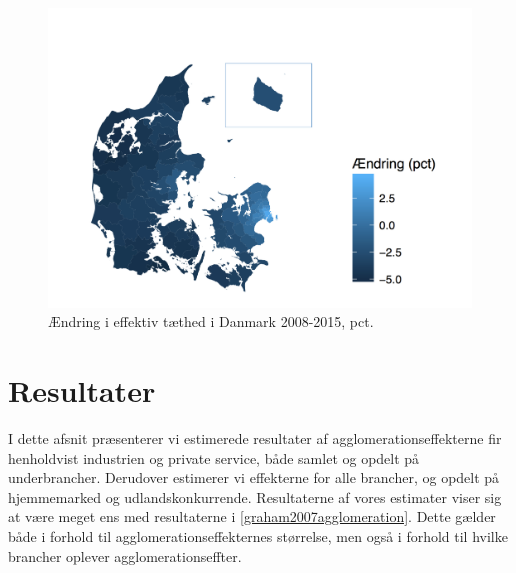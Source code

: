 \documentclass[a4paper, 12pt, titlepage]{article}
\begin{document}
\begin{figure}[tb] 
  \centering
  \includegraphics[width=\textwidth]{andring.pdf}
  \caption{Ændring i effektiv tæthed i Danmark 2008-2015, pct.}
  \label{fig:aendring}
\end{figure}

  
  
 
 
 



\section{Resultater}
I dette afsnit præsenterer vi estimerede resultater af agglomerationseffekterne fir henholdvist industrien og private service, både samlet og opdelt på underbrancher. Derudover estimerer vi effekterne for alle brancher, og opdelt på hjemmemarked og udlandskonkurrende. Resultaterne af vores estimater viser sig at være meget ens med resultaterne i \ref{graham2007agglomeration}. Dette gælder både i forhold til agglomerationseffekternes størrelse, men også i forhold til hvilke brancher oplever agglomerationseffter. 
\end{document}
